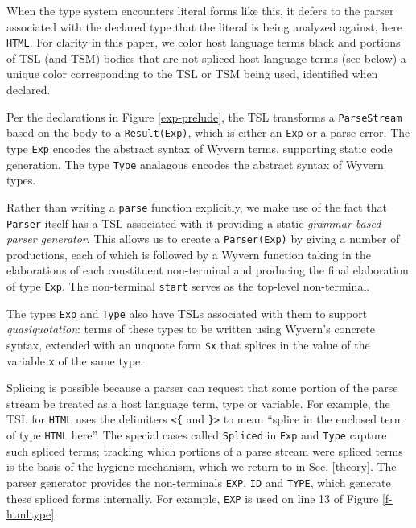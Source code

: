 \documentclass{sig-alternate}[10pt]
\begin{document}
When the type system encounters literal forms like this, it defers to the parser associated with the declared type that the literal is being analyzed against, here \verb|HTML|. For clarity in this paper, we color host language terms black and portions of TSL (and TSM) bodies that are not spliced host language terms (see below)  a unique color corresponding to the TSL or TSM being used, identified when declared. 

Per the declarations in Figure \ref{exp-prelude}, the TSL transforms a \verb|ParseStream| based on the body to a \verb|Result(Exp)|, which is either an \verb|Exp| or a parse error. The type \verb|Exp| encodes the abstract syntax of Wyvern terms, supporting static code generation. The type \verb|Type| analagous encodes the abstract syntax of Wyvern types.

Rather than writing a \verb|parse| function explicitly, we make use of the fact that \verb|Parser| itself has a TSL associated with it providing a static \emph{grammar-based parser generator}. This allows us to create a \verb|Parser(Exp)| by giving a number of productions, each of which is followed by a Wyvern function taking in the elaborations of each constituent non-terminal and producing the final elaboration of type \verb|Exp|. The non-terminal \verb|start| serves as the top-level non-terminal. 

The types \verb|Exp| and \verb|Type| also have TSLs associated with them to support \emph{quasiquotation}: terms of these types  to be written using Wyvern's concrete syntax, extended with an unquote form \verb|$x| that splices in the value of the variable \verb|x| of the same type.  %

Splicing is possible because a parser can request that some portion of the parse stream be treated as a host language term, type or variable. For example, the TSL for \verb|HTML| uses the delimiters \verb|<{| and \verb|}>| to mean ``splice in the enclosed term  of type \verb|HTML| here''. The special cases called \verb|Spliced| in \verb|Exp| and \verb|Type| capture such spliced terms; tracking which portions of a parse stream were spliced terms is the basis of the hygiene mechanism, which we return to in Sec. \ref{theory}. The parser generator provides the non-terminals \verb|EXP|, \verb|ID| and \verb|TYPE|, which generate these spliced forms internally. For example, \verb|EXP| is used on line 13 of Figure \ref{f-htmltype}. %
\end{document}
